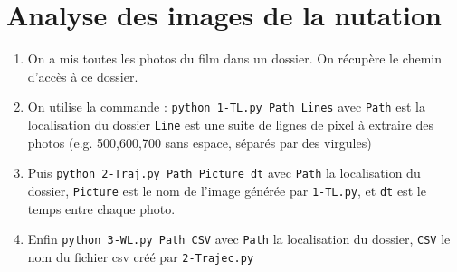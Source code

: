 \documentclass[10pt,a4paper]{article}
\begin{document}
\section{Analyse des images de la nutation\label{anaNut}}
\begin{enumerate}
    \item On a mis toutes les photos du film dans un dossier. On récupère le chemin d'accès à ce dossier.
    \item On utilise la commande : \texttt{python 1-TL.py Path Lines} avec \texttt{Path} est la localisation du dossier \texttt{Line} est une suite de lignes de pixel à extraire des photos (e.g. 500,600,700 sans espace, séparés par des virgules)
    \item Puis \texttt{python 2-Traj.py Path Picture dt} avec \texttt{Path} la localisation du dossier, \texttt{Picture} est le nom de l'image générée par \texttt{1-TL.py}, et \texttt{dt} est le temps entre chaque photo.
    \item Enfin \texttt{python 3-WL.py Path CSV} avec \texttt{Path} la localisation du dossier, \texttt{CSV} le nom du fichier csv créé par \texttt{2-Trajec.py}
\end{enumerate}
\end{document}
